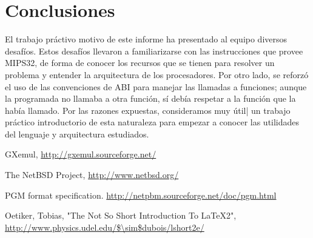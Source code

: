 \documentclass[a4paper,10pt]{article}
\begin{document}
\pagebreak



\section{Conclusiones}
El trabajo pr\'activo motivo de este informe ha presentado al equipo diversos desaf\'ios. 
Estos  desaf\'ios llevaron a familiarizarse con las instrucciones que provee MIPS32, de forma 
de conocer los recursos que se tienen para resolver un problema y entender la arquitectura de 
los procesadores. Por otro lado, se reforz\'o el uso de las convenciones de ABI para manejar las 
llamadas a funciones; aunque la programada no llamaba a otra funci\'on, s\'i deb\'ia respetar a la 
funci\'on que la hab\'ia llamado.
Por las razones expuestas, consideramos muy \'util| un trabajo pr\'actico introductorio de esta 
naturaleza para empezar a conocer las utilidades del lenguaje y arquitectura estudiados.\\

\pagebreak

\begin{thebibliography}{99}

 GXemul, \url{http://gxemul.sourceforge.net/}

 The NetBSD Project, \url{http://www.netbsd.org/}

 PGM format specification.
\url{http://netpbm.sourceforge.net/doc/pgm.html}

 Oetiker, Tobias, "The Not So Short Introduction To LaTeX2", \url{http://www.physics.udel.edu/$\sim$dubois/lshort2e/}

\end{thebibliography}
\end{document}
